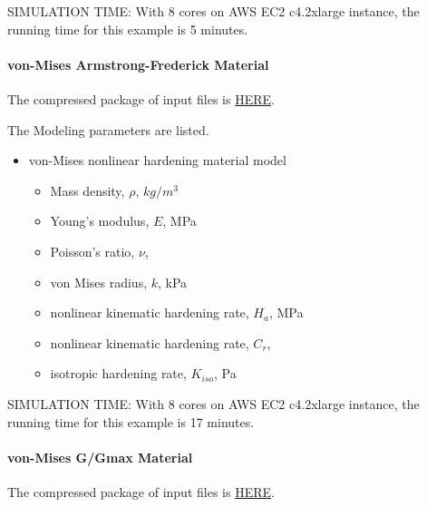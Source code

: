SIMULATION TIME: With 8 cores on AWS EC2 c4.2xlarge instance, the running time for this example is 5 minutes.

\paragraph{von-Mises Armstrong-Frederick Material}
The compressed package of input files is  
\href{https://github.com/yuan-energy/Real-ESSI-Short-Course-Examples/tree/master/short-course-examples/nonlinear_analysis_steps/free_field_3D/elastoplastic/elastoplastic.tgz?raw=true}{HERE}. 

The Modeling parameters are listed.
\begin{itemize}
  \item von-Mises nonlinear hardening material model 
  \begin{itemize}
    \item Mass density, $\rho$, \enspace {} $kg/m^3$
    \item Young's modulus, $E$, \enspace {} MPa
    \item Poisson's ratio, $\nu$, \enspace {}
    \item von Mises radius, $k$, \enspace {} kPa
    \item nonlinear kinematic hardening rate, $H_a$, \enspace {} MPa
    \item nonlinear kinematic hardening rate, $C_r$, \enspace {}
    \item isotropic hardening rate, $K_{iso}$, \enspace {} Pa
  \end{itemize}
\end{itemize}

SIMULATION TIME: With 8 cores on AWS EC2 c4.2xlarge instance, the running time for this example is 17 minutes.

\paragraph{von-Mises G/Gmax Material}
The compressed package of input files is  
\href{https://github.com/yuan-energy/Real-ESSI-Short-Course-Examples/tree/master/short-course-examples/nonlinear_analysis_steps/free_field_3D/vonMisesGoverGmax/vonMisesGoverGmax.tgz?raw=true}{HERE}. 

